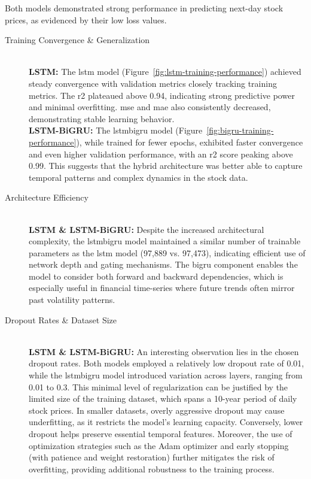 Both models demonstrated strong performance in predicting next-day stock prices, as evidenced by their low loss values.

\begin{description}
    \item[Training Convergence \& Generalization] 
        \leavevmode\\[1em]
        \textbf{LSTM:} The \acrshort{lstm} model (Figure~\ref{fig:lstm-training-performance}) achieved
            steady convergence with 
            validation metrics closely tracking training metrics. The \acrshort{r2} plateaued above 0.94, 
            indicating strong predictive power and minimal overfitting. \acrshort{mse} and \acrshort{mae} also 
            consistently decreased, demonstrating stable learning behavior.
        \leavevmode\\[1em]
        \textbf{LSTM-BiGRU:} The \acrshort{lstmbigru} model (Figure~\ref{fig:bigru-training-performance}), while 
        trained for fewer epochs, exhibited 
        faster convergence and even higher validation performance, with an \acrshort{r2} score peaking above 0.99. This
        suggests that the hybrid architecture was better able to capture temporal patterns and complex dynamics in the 
        stock data.
    \item[Architecture Efficiency] 
        \leavevmode\\[1em]
        \textbf{LSTM \& LSTM-BiGRU:} Despite the increased architectural complexity, the \acrshort{lstmbigru} model
        maintained a similar number of trainable parameters as the \acrshort{lstm} model (97,889 vs. 97,473), 
        indicating efficient use of network depth and gating mechanisms. The \acrshort{bigru} component enables the 
        model to consider both forward and backward dependencies, which is especially useful in 
        financial time-series where future trends often mirror past volatility patterns.
    \item[Dropout Rates \& Dataset Size] 
        \leavevmode\\[1em]
        \textbf{LSTM \& LSTM-BiGRU:} 
        An interesting observation lies in the chosen dropout rates. Both models 
        employed a relatively low dropout rate of 0.01, while the \acrshort{lstmbigru} model introduced variation 
        across layers, ranging from 0.01 to 0.3. This minimal level of regularization can be justified by the limited 
        size of the training dataset, which spans a 10-year period of daily stock prices. In smaller datasets, 
        overly aggressive dropout may cause underfitting, as it restricts the model's learning capacity. Conversely, 
        lower dropout helps preserve essential temporal features. Moreover, the use of optimization strategies such 
        as the Adam optimizer and early stopping (with patience and weight restoration) further mitigates the 
        risk of overfitting, providing additional robustness to the training process. 
\end{description}

